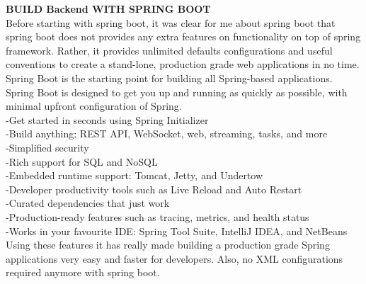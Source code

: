 \documentclass{scrartcl}
\begin{document}
\textbf{BUILD Backend WITH SPRING BOOT}\\
Before starting with spring boot, it was clear for me about spring boot that spring boot does not provides any extra features on functionality on top of spring framework. Rather, it provides unlimited defaults configurations and useful conventions to create a stand-lone, production grade web applications in no time.\\
Spring Boot is the starting point for building all Spring-based applications. Spring Boot is designed to get you up and running as quickly as possible, with minimal upfront configuration of Spring.\\
 -Get started in seconds using Spring Initializer\\
-Build anything: REST API, WebSocket, web, streaming, tasks, and more\\
-Simplified security\\
-Rich support for SQL and NoSQL\\
-Embedded runtime support: Tomcat, Jetty, and Undertow\\
-Developer productivity tools such as Live Reload and Auto Restart\\
-Curated dependencies that just work\\
-Production-ready features such as tracing, metrics, and health status\\
-Works in your favourite IDE: Spring Tool Suite, IntelliJ IDEA, and NetBeans\\

Using these features it has really made building a production grade Spring applications very easy and faster for developers. Also, no XML configurations required anymore with spring boot.\\
\end{document}
